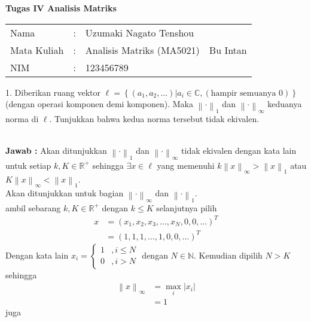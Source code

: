 \documentclass[11pt,a4paper]{article}
\newcommand{\ds}{\displaystyle}
\theoremstyle{plain}
\theoremstyle{definition}
\theoremstyle{remark}
\begin{document}
\begin{enumerate}
\newpage


\begin{center}
	\textbf{Tugas IV Analisis Matriks}
\end{center}


\begin{tabular}{llll}
	Nama        & : & Uzumaki Nagato Tenshou    &          \\
	Mata Kuliah & : & Analisis Matriks (MA5021) & Bu Intan \\
	NIM        & : & 123456789                  &         
\end{tabular}


\begin{enumerate}
	
	\- \\
	\textbf{Jawab :} Akan ditunjukkan $\left\|\cdot\right\|_{1}$ dan $\left\|\cdot\right\|_{\infty}$ tidak ekivalen dengan kata lain untuk setiap $k,K\in \mathbb{R}^{+}$ sehingga $\exists x\in \ell$  yang memenuhi $k\left\| x\right\|_{\infty}>\left\| x\right\|_{1}$ atau $K\left\| x\right\|_{\infty}< \left\| x\right\|_{1}$.\\
	Akan ditunjukkan untuk bagian $\left\| \cdot\right\|_{\infty}$ dan $\left\| \cdot\right\|_{1}$.\\
	ambil sebarang $k,K\in \mathbb{R}^{+}$ dengan $k\leq K$ selanjutnya pilih 
	\begin{align*}
	x &= \left( x_{1},x_{2},x_{3},\ldots,x_{N},0,0,\ldots\right)^{T} \\
	&= \left( 1,1,1,\ldots,1,0,0,\ldots\right)^{T}
	\end{align*}
	Dengan kata lain $x_{i}= \begin{cases}
	1 &,  i\leq N\\
	0 &,  i>N
	\end{cases}$ dengan $N\in \mathbb{N}$. Kemudian dipilih $N>K$ sehingga
	\begin{align*}
	\left\| x\right\|_{\infty} &=\ds \max_{i} \left| x_{i}\right| \\
	&= 1
	\end{align*} juga

\end{enumerate}
\end{enumerate}
\end{document}
